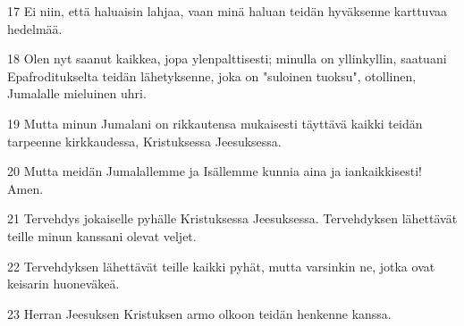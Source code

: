 \par 17 Ei niin, että haluaisin lahjaa, vaan minä haluan teidän hyväksenne karttuvaa hedelmää.
\par 18 Olen nyt saanut kaikkea, jopa ylenpalttisesti; minulla on yllinkyllin, saatuani Epafroditukselta teidän lähetyksenne, joka on "suloinen tuoksu", otollinen, Jumalalle mieluinen uhri.
\par 19 Mutta minun Jumalani on rikkautensa mukaisesti täyttävä kaikki teidän tarpeenne kirkkaudessa, Kristuksessa Jeesuksessa.
\par 20 Mutta meidän Jumalallemme ja Isällemme kunnia aina ja iankaikkisesti! Amen.
\par 21 Tervehdys jokaiselle pyhälle Kristuksessa Jeesuksessa. Tervehdyksen lähettävät teille minun kanssani olevat veljet.
\par 22 Tervehdyksen lähettävät teille kaikki pyhät, mutta varsinkin ne, jotka ovat keisarin huoneväkeä.
\par 23 Herran Jeesuksen Kristuksen armo olkoon teidän henkenne kanssa.


